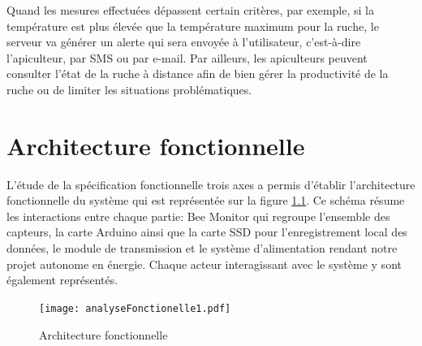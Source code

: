 Quand les mesures effectuées dépassent certain critères, par exemple, si la température est plus élevée que la température maximum pour la ruche, le serveur va générer un alerte qui sera envoyée à l'utilisateur, c’est-à-dire l'apiculteur, par SMS ou par e-mail. Par ailleurs, les apiculteurs peuvent consulter l’état de la ruche à distance afin de bien gérer la productivité de la ruche ou de limiter les situations problématiques. 

\pagebreak

\chapter{Architecture fonctionnelle}

L'étude de la spécification fonctionnelle trois axes a permis d'établir l'architecture fonctionnelle du système qui est représentée sur la figure \ref{fig:anaFonc}.
Ce schéma résume les interactions entre chaque partie: Bee Monitor qui regroupe l'ensemble des capteurs, la carte Arduino ainsi que la carte SSD pour l'enregistrement local des données, le module de transmission et le système d'alimentation rendant notre projet autonome en énergie. Chaque acteur interagissant avec le système y sont également représentés. 
  

\begin{figure}[h]
\centering\texttt{[image: analyseFonctionelle1.pdf]}
\caption{\label{fig:anaFonc} Architecture fonctionnelle}
\end{figure}    

